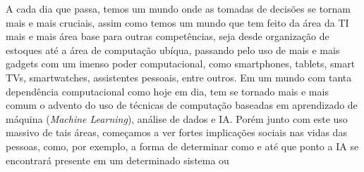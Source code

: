 


A cada dia que passa, temos um mundo onde as tomadas de decisões se tornam mais e mais cruciais, assim como temos um mundo que tem feito da área da \acrshort{TI} mais e mais área base para outras competências, seja desde organização de estoques até a área de computação ubíqua, passando pelo uso de mais e mais gadgets com um imenso poder computacional, como smartphones, tablets, smart TVs, smartwatches, assistentes pessoais, entre outros. Em um mundo com tanta dependência computacional como hoje em dia, tem se tornado mais e mais comum o advento do uso de técnicas de computação baseadas em aprendizado de máquina (\textit{Machine Learning}), análise de dados e \acrshort{IA}. Porém junto com este uso massivo de tais áreas, começamos a ver fortes implicações sociais nas vidas das pessoas, como, por exemplo, a forma de determinar como e até que ponto a \acrshort{IA} se encontrará presente em um determinado sistema ou  